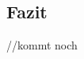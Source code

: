 \documentclass[conference]{IEEEtran}
\begin{document}
	\subsection{Fazit}
	//kommt noch

	
\end{document}
